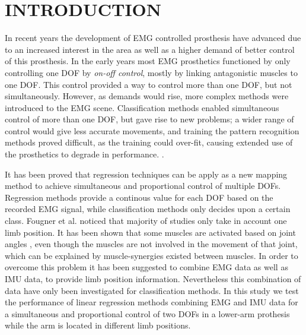 \documentclass[a4paper, 10pt, conference]{ieeeconf}      %
\begin{document}
	
	\section{INTRODUCTION}
In recent years the development of EMG controlled prosthesis have advanced due to an increased interest in the area as well as a higher demand of better control of this prosthesis.\cite{fougner2012}
In the early years most EMG prosthetics functioned by only controlling one DOF by \textit{on-off control}, mostly by linking antagonistic muscles to one DOF. %
This control provided a way to control more than one DOF, but not simultaneously. However, as demands would rise, more complex methods were introduced to the EMG scene. Classification methods enabled simultaneous control of more than one DOF, but gave rise to new problems; a wider range of control would give less accurate movements, and training the pattern recognition methods proved difficult, as the training could over-fit, causing extended use of the prosthetics to degrade in performance. \cite{Ison2016}.
 
It has been proved that regression techniques can be apply as a new mapping method to achieve simultaneous and proportional control of multiple DOFs\cite{hanhe2014}. Regression methods provide a continous value for each DOF based on the recorded EMG signal, while classification methods only decides upon a certain class. %
 Fougner et al.\cite{Fougner2011} noticed that majority of studies only take in account one limb position. It has been shown that some muscles are activated based on joint angles \cite{reference}, even though the muscles are not involved in the movement of that joint, which can be explained by muscle-synergies existed between muscles.
In order to overcome this problem it has been suggested to combine EMG data as well as IMU data, to provide limb position information. Nevertheless this combination of data have only been investigated for classification methods. 
In this study we test the performance of linear regression methods combining EMG and IMU data for a simultaneous and proportional control of two DOFs in a lower-arm prothesis while the arm is located in different limb positions.
	
\end{document}
